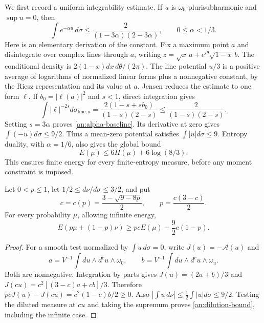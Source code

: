 We first record a uniform integrability estimate. If $u$ is
$\omega_0$-plurisubharmonic and $\sup u=0$, then
\begin{equation}
 \int e^{-\alpha u}\,d\sigma\le
 \frac{2}{(1-3\alpha)(2-3\alpha)},\qquad 0\le\alpha<1/3.
 \label{an:alpha-baseline}
\end{equation}
Here is an elementary derivation of the constant. Fix a maximum point
$a$ and disintegrate over complex lines through $a$, writing
$z=\sqrt{x}\,a+e^{i\theta}\sqrt{1-x}\,b$. The conditional density is
$2(1-x)dx\,d\theta/(2\pi)$. The line potential $u/3$ is a positive
average of logarithms of normalized linear forms plus a nonnegative
constant, by the Riesz representation and its value at $a$. Jensen
reduces the estimate to one form $\ell$.
If $b_0=|\ell(a)|^2$ and $s<1$, direct integration gives
\[
 \int|\ell|^{-2s}d\sigma_{\text{line},a}
 =\frac{2(1-s+sb_0)}{(1-s)(2-s)}
 \le\frac2{(1-s)(2-s)}.
\]
Setting $s=3\alpha$ proves \eqref{an:alpha-baseline}. Its derivative
at zero gives $\int(-u)d\sigma\le9/2$. Thus a mean-zero potential
satisfies $\int|u|d\sigma\le9$. Entropy duality, with $\alpha=1/6$,
also gives the global bound
\begin{equation}
 E(\mu)\le6H(\mu)+6\log(8/3).
 \label{an:entropy-to-energy}
\end{equation}
This ensures finite energy for every finite-entropy measure, before any
moment constraint is imposed.

\begin{proposition}
\label{an:dilution}
Let $0<p\le1$, let $1/2\le d\nu/d\sigma\le3/2$, and put
\[
 c=c(p)=\frac{3-\sqrt{9-8p}}2,\qquad p=\frac{c(3-c)}2.
\]
For every probability $\mu$, allowing infinite energy,
\begin{equation}
 E(p\mu+(1-p)\nu)\ge pcE(\mu)-\frac92c(1-p).
 \label{an:dilution-bound}
\end{equation}
\end{proposition}

\begin{proof}
For a smooth test normalized by $\int u\,d\sigma=0$, write
$J(u)=-\mathcal A(u)$ and
\[
 a=V^{-1}\int du\wedge d^cu\wedge\omega_0,\qquad
 b=V^{-1}\int du\wedge d^cu\wedge\omega_u.
\]
Both are nonnegative. Integration by parts gives
$J(u)=(2a+b)/3$ and $J(cu)=c^2[(3-c)a+cb]/3$. Therefore
$pcJ(u)-J(cu)=c^2(1-c)b/2\ge0$. Also
$|\int u\,d\nu|\le\tfrac12\int|u|d\sigma\le9/2$.
Testing the diluted measure at $cu$ and taking the supremum proves
\eqref{an:dilution-bound}, including the infinite case.
\end{proof}

